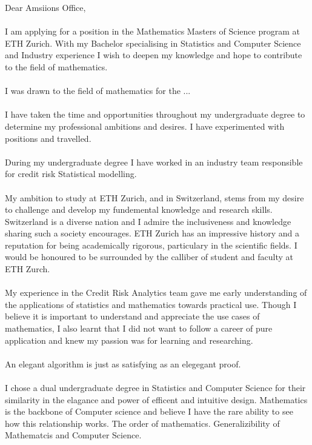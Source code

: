 Dear Amsiions Office,\\
\\
I am applying for a position in the Mathematics Masters of Science program at ETH Zurich. With my Bachelor specialising in Statistics and Computer Science and Industry experience I wish to deepen my knowledge and hope to contribute to the field of mathematics.\\
\\
I was drawn to the field of mathematics for the ...\\
\\
I have taken the time and opportunities throughout my undergraduate degree to determine my professional ambitions and desires. I have experimented with positions and travelled.\\
\\
During my undergraduate degree I have worked in an industry team responsible for credit risk Statistical modelling.\\
\\
My ambition to study at ETH Zurich, and in Switzerland, stems from my desire to challenge and develop my fundemental knowledge and research skills. Switzerland is a diverse nation and I admire the inclusiveness and knowledge sharing such a society encourages. ETH Zurich has an impressive history and a reputation for being academically rigorous, particulary in the scientific fields. I would be honoured to be surrounded by the calliber of student and faculty at ETH Zurch.\\
\\
My experience in the Credit Risk Analytics team gave me early understanding of the applications of statistics and mathematics towards practical use. Though I believe it is important to understand and appreciate the use cases of mathematics, I also learnt that I did not want to follow a career of pure application and knew my passion was for learning and researching.\\ 
\\
An elegant algorithm is just as satisfying as an elegegant proof.\\
\\
I chose a dual undergraduate degree in Statistics and Computer Science for their similarity in the elagance and power of efficent and intuitive design. Mathematics is the backbone of Computer science and believe I have the rare ability to see how this relationship works. The order of mathematics. Generalizibility of Mathematcis and Computer Science.\\
